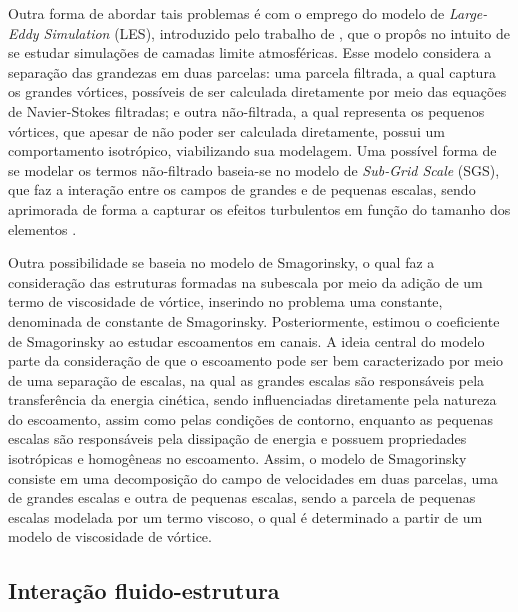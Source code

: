Outra forma de abordar tais problemas é com o emprego do modelo de \textit{Large-Eddy Simulation} (LES), introduzido pelo trabalho de , que o propôs no intuito de se estudar simulações de camadas limite atmosféricas. Esse modelo considera a separação das grandezas em duas parcelas: uma parcela filtrada, a qual captura os grandes vórtices, possíveis de ser calculada diretamente por meio das equações de Navier-Stokes filtradas; e outra não-filtrada, a qual representa os pequenos vórtices, que apesar de não poder ser calculada diretamente, possui um comportamento isotrópico, viabilizando sua modelagem. Uma possível forma de se modelar os termos não-filtrado baseia-se no modelo de \textit{Sub-Grid Scale} (SGS), que faz a interação entre os campos de grandes e de pequenas escalas, sendo aprimorada de forma a capturar os efeitos turbulentos em função do tamanho dos elementos \cite{ghosal1995basic,hughes2000large,moeng2015large}.

Outra possibilidade se baseia no modelo de Smagorinsky, o qual faz a consideração das estruturas formadas na subescala por meio da adição de um termo de viscosidade de vórtice, inserindo no problema uma constante, denominada de constante de Smagorinsky. Posteriormente,  estimou o coeficiente de Smagorinsky ao estudar escoamentos em canais. A ideia central do modelo parte da consideração de que o escoamento pode ser bem caracterizado por meio de uma separação de escalas, na qual as grandes escalas são responsáveis pela transferência da energia cinética, sendo influenciadas diretamente pela natureza do escoamento, assim como pelas condições de contorno, enquanto as pequenas escalas são responsáveis pela dissipação de energia e possuem propriedades isotrópicas e homogêneas no escoamento. Assim, o modelo de Smagorinsky consiste em uma decomposição do campo de velocidades em duas parcelas, uma de grandes escalas e outra de pequenas escalas, sendo a parcela de pequenas escalas modelada por um termo viscoso, o qual é determinado a partir de um modelo de viscosidade de vórtice.

\subsection{Interação fluido-estrutura} \label{IFE}

